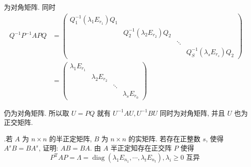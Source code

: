 \documentclass{article}
\begin{document}
为对角矩阵. 同时
$$
    \begin{aligned}
        Q^{-1} P^{-1} A P Q & =\left(\begin{array}{cccc}
                Q_{1}^{-1}\left(\lambda_{1} E_{r_{1}}\right) Q_{1} &                                                    &        &                                                    \\
                                                                   & Q_{2}^{-1}\left(\lambda_{2} E_{r_{2}}\right) Q_{2} &        &                                                    \\
                                                                   &                                                    & \ddots &                                                    \\
                                                                   &                                                    &        & Q_{S}^{-1}\left(\lambda_{s} E_{r_{s}}\right) Q_{2}
            \end{array}\right) \\
                            & =\left(\begin{array}{cccc}
                \lambda_{1} E_{r_{1}} &                       &        &                       \\
                                      & \lambda_{2} E_{r_{2}} &        &                       \\
                                      &                       & \ddots &                       \\
                                      &                       &        & \lambda_{s} E_{r_{0}}
            \end{array}\right)
    \end{aligned}
$$

仍为对角矩阵. 所以取 $U=P Q$ 就有 $U^{-1} A U, U^{-1} B U$ 同时为对角矩阵, 并且 $U$ 也为正交矩阵.

\vspace{1ex}
{.}若 $A$ 为 $n \times n$ 的半正定矩阵, $B$ 为 $n \times n$ 的实矩阵. 若存在正整数 $s$, 使得 $A^{s} B=B A^{s}$, 证明: $A B=B A .$
由 $A$ 半正定知存在正交阵 $P$ 使得
$$
    P^{\mathrm{T}} A P=\Lambda=\operatorname{diag}\left(\lambda_{1} E_{n_{1}}, \cdots, \lambda_{t} E_{n_{t}}\right), \lambda_{i} \geq 0 \text { 互异 }
$$
\end{document}
